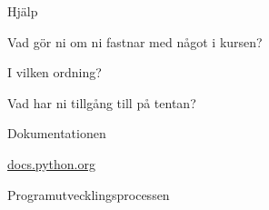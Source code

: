\documentclass{beamer}
\begin{document}
  \begin{frame}{Hjälp}

    Vad gör ni om ni fastnar med något i kursen?

    I vilken ordning?

    \pause{}

    Vad har ni tillgång till på tentan?

  \end{frame}

  \begin{frame}{Dokumentationen}

    \url{docs.python.org}

  \end{frame}

  \begin{frame}{Programutvecklingsprocessen}

  \end{frame}
\end{document}
